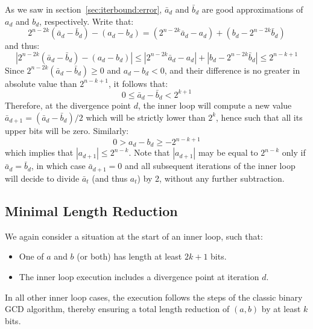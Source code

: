 \documentclass{llncs}
\begin{document}
As we saw in section~\ref{sec:iterbound:error}, $\bar a_d$ and $\bar b_d$
are good approximations of $a_d$ and $b_d$, respectively. Write that:
\begin{equation*}
    2^{n-2k} (\bar a_d - \bar b_d) - (a_d - b_d)
        = (2^{n-2k} \bar a_d - a_d) + (b_d - 2^{n-2k} \bar b_d)
\end{equation*}
and thus:
\begin{equation*}
    |2^{n-2k} (\bar a_d - \bar b_d) - (a_d - b_d)|
        \leq |2^{n-2k} \bar a_d - a_d| + |b_d - 2^{n-2k} \bar b_d|
        \leq 2^{n-k+1}
\end{equation*}
Since $2^{n-2k}(\bar a_d - \bar b_d) \geq 0$ and $a_d - b_d < 0$, and their
difference is no greater in absolute value than $2^{n-k+1}$, it follows that:
\begin{equation*}
    0 \leq \bar a_d - \bar b_d < 2^{k+1}
\end{equation*}
Therefore, at the divergence point $d$, the inner loop will compute a new
value $\bar a_{d+1} = (\bar a_d - \bar b_d)/2$ which will be strictly lower
than $2^k$, hence such that all its upper bits will be zero. Similarly:
\begin{equation*}
    0 > a_d - b_d \geq -2^{n-k+1}
\end{equation*}
which implies that $|a_{d+1}| \leq 2^{n-k}$. Note that $|a_{d+1}|$ may
be equal to $2^{n-k}$ only if $\bar a_d = \bar b_d$, in which case $\bar
a_{d+1} = 0$ and all subsequent iterations of the inner loop will decide
to divide $\bar a_t$ (and thus $a_t$) by 2, without any further
subtraction.

\subsection{Minimal Length Reduction}\label{sec:iterbound:minred}

We again consider a situation at the start of an inner loop, such that:
\begin{itemize}

    \item One of $a$ and $b$ (or both) has length at least $2k+1$ bits.

    \item The inner loop execution includes a divergence point at
    iteration $d$.

\end{itemize}
In all other inner loop cases, the execution follows the steps of the
classic binary GCD algorithm, thereby ensuring a total length reduction
of $(a,b)$ by at least $k$ bits.
\end{document}
